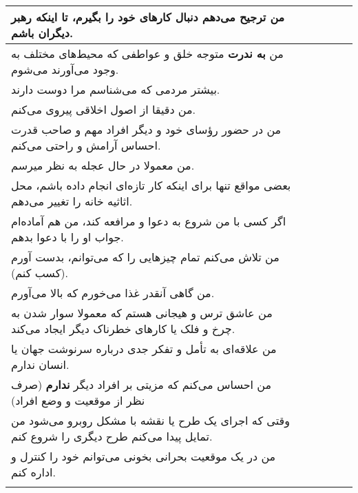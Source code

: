 \documentclass[a4paper,10pt]{article}
\begin{document}
\begin{center}
\begin{tabular}{|p{6cm}|c|c|c|c|c|}
من ترجیح می‌دهم دنبال کارهای خود را بگیرم، تا اینکه رهبر دیگران باشم.& & & & & \\
\hline


من \textbf{به ندرت} متوجه خلق و عواطفی که محیط‌های مختلف به وجود می‌آورند می‌شوم.& & & & & \\
\hline


بیشتر مردمی که می‌شناسم مرا دوست دارند.& & & & & \\
\hline


من دقیقا از اصول اخلاقی پیروی می‌کنم.& & & & & \\
\hline


من در حضور رؤسای خود و دیگر افراد مهم و صاحب قدرت احساس آرامش و راحتی می‌کنم.& & & & & \\
\hline


من معمولا در حال عجله به نظر میرسم.& & & & & \\
\hline


بعضی مواقع تنها برای اینکه کار تازه‌ای انجام داده باشم، محل اثاثیه خانه را تغییر می‌دهم.& & & & & \\
\hline


اگر کسی با من شروع به دعوا و مرافعه کند، من هم آماده‌ام جواب او را با دعوا بدهم.& & & & & \\
\hline


من تلاش می‌کنم تمام چیزهایی را که می‌توانم، بدست آورم (کسب کنم).& & & & & \\
\hline


من گاهی آنقدر غذا می‌خورم که بالا می‌آورم.& & & & & \\
\hline


من عاشق ترس و هیجانی هستم که معمولا سوار شدن به چرخ و فلک یا کارهای خطرناک دیگر ایجاد می‌کند.& & & & & \\
\hline


 من علاقه‌ای به تأمل و تفکر جدی درباره سرنوشت جهان یا انسان ندارم.& & & & & \\
\hline


من احساس می‌کنم که مزیتی بر افراد دیگر \textbf{ندارم} (صرف‌ نظر از موقعیت و وضع افراد)& & & & & \\
\hline


وقتی که اجرای یک طرح یا نقشه با مشکل روبرو می‌شود من تمایل پیدا می‌کنم طرح دیگری را شروع کنم.& & & & & \\
\hline


من در یک موقعیت بحرانی بخونی می‌توانم خود را کنترل و اداره کنم.& & & & & \\
\hline


& & & & & \\
\hline



\end{tabular}
\end{center}
\end{document}
